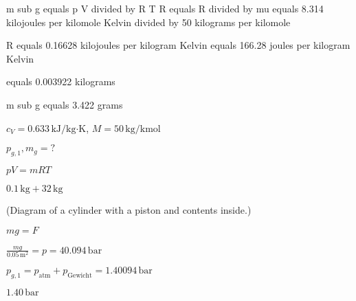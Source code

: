 m sub g equals p V divided by R T  
R equals R divided by mu equals 8.314 kilojoules per kilomole Kelvin divided by 50 kilograms per kilomole  

R equals 0.16628 kilojoules per kilogram Kelvin equals 166.28 joules per kilogram Kelvin  

equals 0.003922 kilograms  

m sub g equals 3.422 grams

\( c_V = 0.633 \, \text{kJ/kg·K} \), \( M = 50 \, \text{kg/kmol} \)  

\( p_{g,1}, m_g = ? \)  

\( p V = m R T \)  

\( 0.1 \, \text{kg} + 32 \, \text{kg} \)  

(Diagram of a cylinder with a piston and contents inside.)  

\( m g = F \)  

\( \frac{m g}{0.05 \, \text{m}^2} = p = 40.094 \, \text{bar} \)  

\( p_{g,1} = p_{\text{atm}} + p_{\text{Gewicht}} = 1.40094 \, \text{bar} \)  

\( 1.40 \, \text{bar} \)